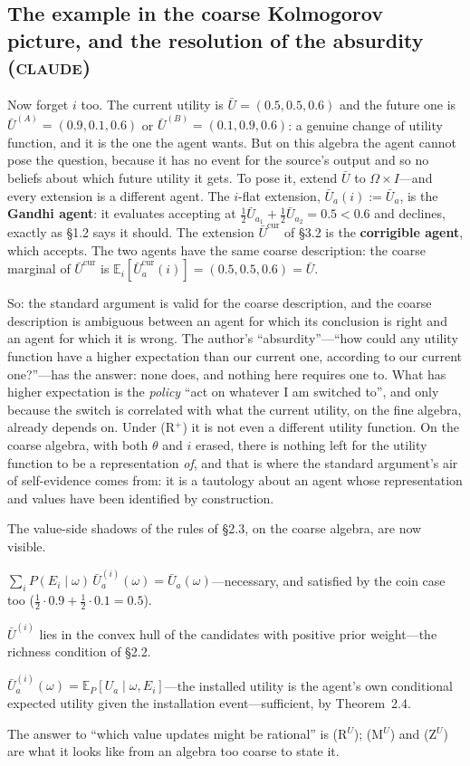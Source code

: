 \documentclass[11pt,a4paper]{article}
\newcommand{\E}{\mathbb{E}}
\newcommand{\Ucur}{\bar U^{\mathrm{cur}}}
\newcommand{\CLAUDE}{\textnormal{\scshape claude}}
\begin{document}
\subsection{The example in the coarse Kolmogorov picture, and the resolution of the absurdity (\CLAUDE)}
Now forget $i$ too. The current utility is $\bar U = (0.5, 0.5, 0.6)$ and the future one is $\bar U^{(A)} = (0.9, 0.1, 0.6)$ or $\bar U^{(B)} = (0.1, 0.9, 0.6)$: a genuine change of utility function, and it is the one the agent wants. But on this algebra the agent cannot pose the question, because it has no event for the source's output and so no beliefs about which future utility it gets. To pose it, extend $\bar U$ to $\Omega \times I$---and every extension is a different agent. The $i$-flat extension, $\bar U_a(i) := \bar U_a$, is the \textbf{Gandhi agent}: it evaluates accepting at $\tfrac12 \bar U_{a_1} + \tfrac12 \bar U_{a_2} = 0.5 < 0.6$ and declines, exactly as \S1.2 says it should. The extension $\Ucur$ of \S3.2 is the \textbf{corrigible agent}, which accepts. The two agents have the same coarse description: the coarse marginal of $\Ucur$ is $\E_i[\Ucur_a(i)] = (0.5, 0.5, 0.6) = \bar U$.

So: the standard argument is valid for the coarse description, and the coarse description is ambiguous between an agent for which its conclusion is right and an agent for which it is wrong. The author's ``absurdity''---``how could any utility function have a higher expectation than our current one, according to our current one?''---has the answer: none does, and nothing here requires one to. What has higher expectation is the \emph{policy} ``act on whatever I am switched to'', and only because the switch is correlated with what the current utility, on the fine algebra, already depends on. Under (R$^+$) it is not even a different utility function. On the coarse algebra, with both $\theta$ and $i$ erased, there is nothing left for the utility function to be a representation \emph{of}, and that is where the standard argument's air of self-evidence comes from: it is a tautology about an agent whose representation and values have been identified by construction.

The value-side shadows of the rules of \S2.3, on the coarse algebra, are now visible.
\begin{description}[leftmargin=2.6em,style=nextline]
\item[(M$^U$) No expected net utility change.] $\sum_i P(E_i \mid \omega)\, \bar U^{(i)}_a(\omega) = \bar U_a(\omega)$---necessary, and satisfied by the coin case too ($\tfrac12 \cdot 0.9 + \tfrac12 \cdot 0.1 = 0.5$).
\item[(Z$^U$) Support.] $\bar U^{(i)}$ lies in the convex hull of the candidates with positive prior weight---the richness condition of \S2.2.
\item[(R$^U$) Value reflection.] $\bar U^{(i)}_a(\omega) = \E_P[U_a \mid \omega, E_i]$---the installed utility is the agent's own conditional expected utility given the installation event---sufficient, by Theorem~2.4.
\end{description}
The answer to ``which value updates might be rational'' is (R$^U$); (M$^U$) and (Z$^U$) are what it looks like from an algebra too coarse to state it.
\end{document}
